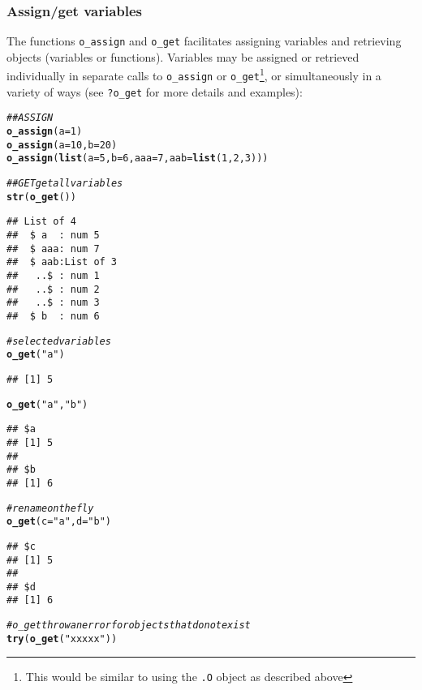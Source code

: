 \documentclass[english,10pt,a4paper]{article}\usepackage[]{graphicx}\usepackage[]{color}
\makeatletter
\newcommand{\hlnum}[1]{\textcolor[rgb]{0.686,0.059,0.569}{#1}}%
\newcommand{\hlstr}[1]{\textcolor[rgb]{0.192,0.494,0.8}{#1}}%
\newcommand{\hlcom}[1]{\textcolor[rgb]{0.678,0.584,0.686}{\textit{#1}}}%
\newcommand{\hlstd}[1]{\textcolor[rgb]{0.345,0.345,0.345}{#1}}%
\newcommand{\hlkwc}[1]{\textcolor[rgb]{0.333,0.667,0.333}{#1}}%
\newcommand{\hlkwd}[1]{\textcolor[rgb]{0.737,0.353,0.396}{\textbf{#1}}}%
\newenvironment{kframe}{%
 \def\at@end@of@kframe{}%
 \ifinner\ifhmode%
  \def\at@end@of@kframe{\end{minipage}}%
  \begin{minipage}{\columnwidth}%
 \fi\fi%
 \def\FrameCommand##1{\hskip\@totalleftmargin \hskip-\fboxsep
 \colorbox{shadecolor}{##1}\hskip-\fboxsep
     \hskip-\linewidth \hskip-\@totalleftmargin \hskip\columnwidth}%
 \MakeFramed {\advance\hsize-\width
   \@totalleftmargin\z@ \linewidth\hsize
   \@setminipage}}%
 {\par\unskip\endMakeFramed%
 \at@end@of@kframe}
\newenvironment{knitrout}{}{} %
\let\code=\texttt
\makeatother
\begin{document}
\subsubsection{Assign/get variables}

The functions \code{o\_assign} and \code{o\_get} facilitates assigning variables
and retrieving objects (variables or functions).
Variables may be assigned or retrieved individually in separate calls to
\code{o\_assign} or \code{o\_get}\footnote{This would be similar to using the
\code{.O} object as described above}, or simultaneously in a variety of ways
(see \code{?o\_get} for more details and examples):

\begin{knitrout}
\color{fgcolor}\begin{kframe}
\begin{alltt}
\hlcom{## ASSIGN}
\hlkwd{o_assign}\hlstd{(}\hlkwc{a} \hlstd{=} \hlnum{1}\hlstd{)}
\hlkwd{o_assign}\hlstd{(}\hlkwc{a} \hlstd{=} \hlnum{10}\hlstd{,} \hlkwc{b} \hlstd{=} \hlnum{20}\hlstd{)}
\hlkwd{o_assign}\hlstd{(}\hlkwd{list}\hlstd{(}\hlkwc{a} \hlstd{=} \hlnum{5}\hlstd{,} \hlkwc{b} \hlstd{=} \hlnum{6}\hlstd{,} \hlkwc{aaa} \hlstd{=} \hlnum{7}\hlstd{,} \hlkwc{aab} \hlstd{=} \hlkwd{list}\hlstd{(}\hlnum{1}\hlstd{,} \hlnum{2}\hlstd{,} \hlnum{3}\hlstd{)))}

\hlcom{## GET get all variables}
\hlkwd{str}\hlstd{(}\hlkwd{o_get}\hlstd{())}
\end{alltt}
\begin{verbatim}
## List of 4
##  $ a  : num 5
##  $ aaa: num 7
##  $ aab:List of 3
##   ..$ : num 1
##   ..$ : num 2
##   ..$ : num 3
##  $ b  : num 6
\end{verbatim}
\begin{alltt}
\hlcom{# selected variables}
\hlkwd{o_get}\hlstd{(}\hlstr{"a"}\hlstd{)}
\end{alltt}
\begin{verbatim}
## [1] 5
\end{verbatim}
\begin{alltt}
\hlkwd{o_get}\hlstd{(}\hlstr{"a"}\hlstd{,} \hlstr{"b"}\hlstd{)}
\end{alltt}
\begin{verbatim}
## $a
## [1] 5
## 
## $b
## [1] 6
\end{verbatim}
\begin{alltt}
\hlcom{# rename on the fly}
\hlkwd{o_get}\hlstd{(}\hlkwc{c} \hlstd{=} \hlstr{"a"}\hlstd{,} \hlkwc{d} \hlstd{=} \hlstr{"b"}\hlstd{)}
\end{alltt}
\begin{verbatim}
## $c
## [1] 5
## 
## $d
## [1] 6
\end{verbatim}
\begin{alltt}
\hlcom{# o_get throw an error for objects that do not exist}
\hlkwd{try}\hlstd{(}\hlkwd{o_get}\hlstd{(}\hlstr{"xxxxx"}\hlstd{))}
\end{alltt}



\end{kframe}
\end{knitrout}
\end{document}
